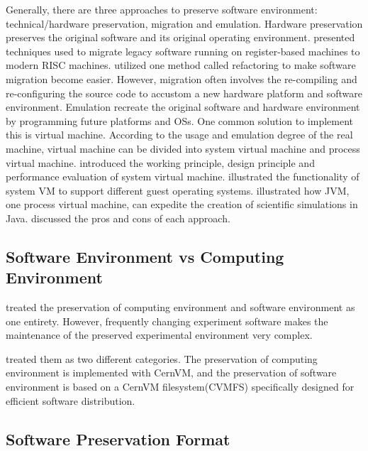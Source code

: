 \documentclass{acm_proc_article-sp}
\begin{document}
Generally, there are three approaches to preserve software environment:
technical/hardware preservation, migration and emulation.  Hardware
preservation preserves the original software and its original operating
environment. \cite{cifuentes1996binary} presented techniques used to migrate
legacy software running on register-based machines to modern RISC machines. \cite{mancl2001refactoring}
utilized one method called refactoring to make software migration become
easier. However, migration often involves the re-compiling and re-configuring
the source code to accustom a new hardware platform and software environment.
Emulation recreate the original software and hardware environment by
programming future platforms and OSs. One common solution to implement this is
virtual machine. According to the usage and emulation degree of the real
machine, virtual machine can be divided into system virtual machine and process
virtual machine. \cite{goldberg1974survey}\cite{smith2005architecture} introduced the working principle, design principle and
performance evaluation of system virtual machine. \cite{barham2003xen}\cite{kivity2007kvm}\cite{rosenblum1999vmware} illustrated the
functionality of  system VM to support different guest operating systems. \cite{esquembre2004easy} illustrated how JVM, one process virtual machine, can expedite the creation of
scientific simulations in Java. \cite{matthews2009towards}\cite{phelps2005no}\cite{hong2010software} discussed the pros and cons of each
approach.

\subsection{Software Environment vs Computing Environment}

\cite{matthews2009towards}\cite{phelps2005no}\cite{hong2010software} treated the preservation of computing environment and software environment as one entirety. However, frequently changing experiment software makes the maintenance of the preserved experimental environment very complex. 

\cite{buncic2010cernvm} treated them as two different categories. The preservation of computing environment is implemented with CernVM, and the preservation of software environment is based on a CernVM filesystem(CVMFS) specifically designed for efficient software distribution.

\subsection{Software Preservation Format}
\end{document}
